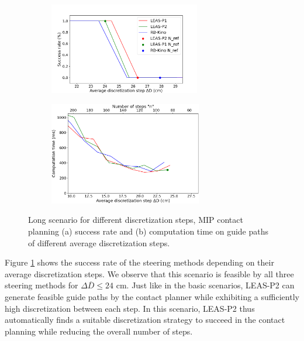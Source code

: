 \begin{figure}[ht]
    \centering
    \captionsetup[subfigure]{justification=centering}
    \begin{subfigure}[t]{0.48\linewidth}
    \includegraphics[trim={0cm 0cm 1.9cm 1.6cm}, clip,width=\textwidth, height=4cm]{Figures/Chapter_MIP_SL1M/res_mip/MIP_res_long/FIGURE_MIP_LONG_2.png}
    \caption{}
    \label{fig:mip:long_range_success_time:success}
    \end{subfigure}
    \begin{subfigure}[t]{0.48\linewidth}
    \includegraphics[trim={0cm 0cm 0cm 0cm}, clip,width=\textwidth, height=4.5cm]{Figures/Chapter_MIP_SL1M/res_mip/time_long.png}
    \caption{}
    \label{fig:mip:long_range_success_time:time}
    \end{subfigure}
    \caption{Long scenario for different discretization steps, MIP contact planning (a) success rate and (b) computation time on guide paths of different average discretization steps.}
    \label{fig:mip:long_range_success_time}
\end{figure}

Figure \ref{fig:mip:long_range_success_time:success} shows the success rate of the steering methods depending on their average discretization steps. We observe that this scenario is feasible by all three steering methods for $\Delta \overline{D} \leq 24$ cm.
Just like in the basic scenarios, LEAS-P2 can generate feasible guide paths by the contact planner while exhibiting a sufficiently high discretization between each step. In this scenario, LEAS-P2 thus automatically finds a suitable discretization strategy to succeed in the contact planning while reducing the overall number of steps.

